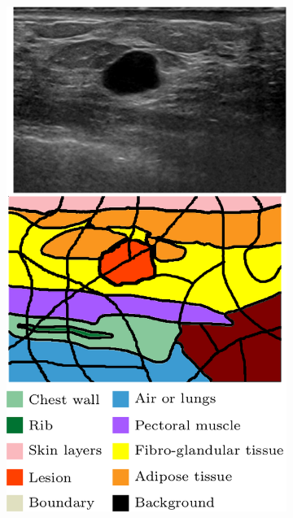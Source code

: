 \begin{figure}[t]
    \centering
    \begin{subfigure}[b]{0.19\textwidth}
        \centering
        \includegraphics[width=\textwidth]{problem}
        \label{fig:methodTerms:problem}
    \end{subfigure}
    \hfill
    \begin{subfigure}[b]{0.39\textwidth}  
        \centering 

\end{subfigure}
\end{figure}
